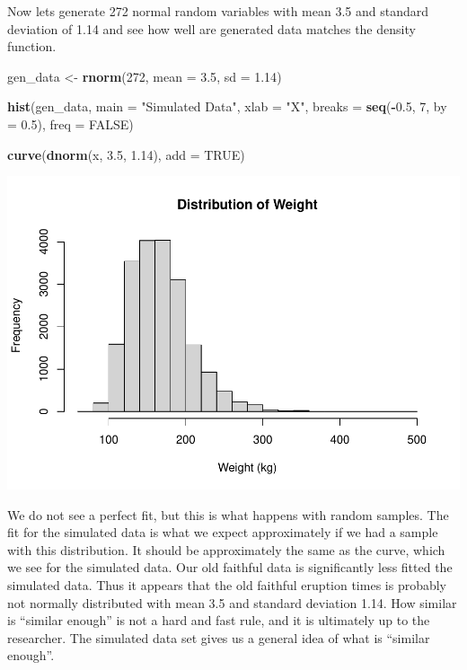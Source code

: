 \documentclass[
]{book}
\newenvironment{Shaded}{\begin{snugshade}}{\end{snugshade}}
\newcommand{\DataTypeTok}[1]{\textcolor[rgb]{0.13,0.29,0.53}{#1}}
\newcommand{\DecValTok}[1]{\textcolor[rgb]{0.00,0.00,0.81}{#1}}
\newcommand{\FloatTok}[1]{\textcolor[rgb]{0.00,0.00,0.81}{#1}}
\newcommand{\KeywordTok}[1]{\textcolor[rgb]{0.13,0.29,0.53}{\textbf{#1}}}
\newcommand{\NormalTok}[1]{#1}
\newcommand{\OperatorTok}[1]{\textcolor[rgb]{0.81,0.36,0.00}{\textbf{#1}}}
\newcommand{\OtherTok}[1]{\textcolor[rgb]{0.56,0.35,0.01}{#1}}
\newcommand{\StringTok}[1]{\textcolor[rgb]{0.31,0.60,0.02}{#1}}
\begin{document}
Now lets generate 272 normal random variables with mean 3.5 and standard deviation of 1.14 and see how well are generated data matches the density function.

\begin{Shaded}
\begin{Highlighting}[]
\NormalTok{gen_data <-}\StringTok{ }\KeywordTok{rnorm}\NormalTok{(}\DecValTok{272}\NormalTok{,}
    \DataTypeTok{mean =} \FloatTok{3.5}\NormalTok{, }\DataTypeTok{sd =} \FloatTok{1.14}\NormalTok{)}

\KeywordTok{hist}\NormalTok{(gen_data, }\DataTypeTok{main =} \StringTok{"Simulated Data"}\NormalTok{,}
    \DataTypeTok{xlab =} \StringTok{"X"}\NormalTok{, }\DataTypeTok{breaks =} \KeywordTok{seq}\NormalTok{(}\OperatorTok{-}\FloatTok{0.5}\NormalTok{,}
        \DecValTok{7}\NormalTok{, }\DataTypeTok{by =} \FloatTok{0.5}\NormalTok{),}
    \DataTypeTok{freq =} \OtherTok{FALSE}\NormalTok{)}

\KeywordTok{curve}\NormalTok{(}\KeywordTok{dnorm}\NormalTok{(x, }\FloatTok{3.5}\NormalTok{, }\FloatTok{1.14}\NormalTok{),}
    \DataTypeTok{add =} \OtherTok{TRUE}\NormalTok{)}
\end{Highlighting}
\end{Shaded}

\includegraphics{_main_files/figure-latex/unnamed-chunk-224-1.pdf}

We do not see a perfect fit, but this is what happens with random samples. The fit for the simulated data is what we expect approximately if we had a sample with this distribution. It should be approximately the same as the curve, which we see for the simulated data. Our old faithful data is significantly less fitted the simulated data. Thus it appears that the old faithful eruption times is probably not normally distributed with mean 3.5 and standard deviation 1.14. How similar is ``similar enough'' is not a hard and fast rule, and it is ultimately up to the researcher. The simulated data set gives us a general idea of what is ``similar enough''.
\end{document}
